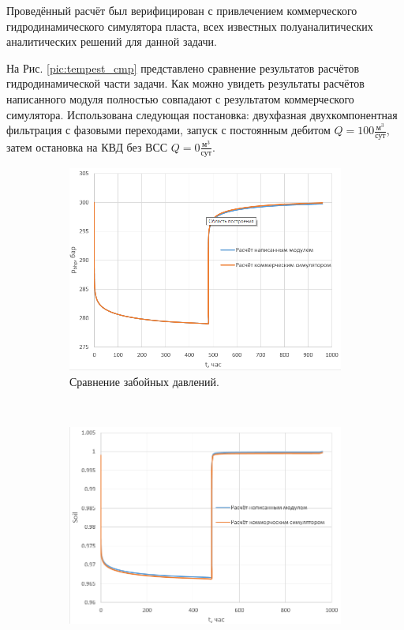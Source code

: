 	Проведённый расчёт был верифицирован с привлечением коммерческого гидродинамического симулятора пласта, всех известных полуаналитических аналитических решений для данной задачи.

	На Рис. \ref{pic:tempest_cmp} представлено сравнение результатов расчётов гидродинамической части задачи.
	Как можно увидеть результаты расчётов написанного модуля полностью совпадают с результатом коммерческого симулятора.
	Использована следующая постановка: двухфазная двухкомпонентная фильтрация с фазовыми переходами, запуск с постоянным дебитом $Q=100 \frac{\text{м}^3}{\text{сут}}$, затем остановка на КВД без ВСС $Q=0 \frac{\text{м}^3}{\text{сут}}$.
\begin{figure}[H]

	\begin{subfigure}[b]{0.5\textwidth}
	\centering
	\includegraphics[width=1\textwidth]{pic/pres_cmp.png}
	\caption{Сравнение забойных давлений.}
	\label{pic:pres_cmp}
	\end{subfigure}
~
	\begin{subfigure}[b]{0.5\textwidth}
		\centering
		\includegraphics[width=1\textwidth]{pic/sat_cmp.png}

\end{subfigure}
\end{figure}
